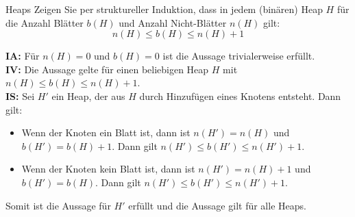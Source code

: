 \documentclass{article}
\begin{document}
\begin{exercise}{Heaps}
  Zeigen Sie per struktureller Induktion, dass in jedem (binären) Heap $H$ für die Anzahl Blätter $b(H)$ und Anzahl Nicht-Blätter $n(H)$ gilt:
  \begin{equation*}
    n(H) \leq b(H) \leq n(H)+1
  \end{equation*}

  \begin{solution}
    \textbf{IA:} Für $n(H) = 0$ und $b(H) = 0$ ist die Aussage trivialerweise erfüllt. \\
    \textbf{IV:} Die Aussage gelte für einen beliebigen Heap $H$ mit $n(H) \leq b(H) \leq n(H)+1$. \\
    \textbf{IS:} Sei $H'$ ein Heap, der aus $H$ durch Hinzufügen eines Knotens entsteht. Dann gilt:
    \begin{itemize}
      \item Wenn der Knoten ein Blatt ist, dann ist $n(H') = n(H)$ und $b(H') = b(H)+1$. Dann gilt $n(H') \leq b(H') \leq n(H')+1$.
      \item Wenn der Knoten kein Blatt ist, dann ist $n(H') = n(H)+1$ und $b(H') = b(H)$. Dann gilt $n(H') \leq b(H') \leq n(H')+1$.
    \end{itemize}
    Somit ist die Aussage für $H'$ erfüllt und die Aussage gilt für alle Heaps.
  \end{solution}
\end{exercise}
\end{document}
